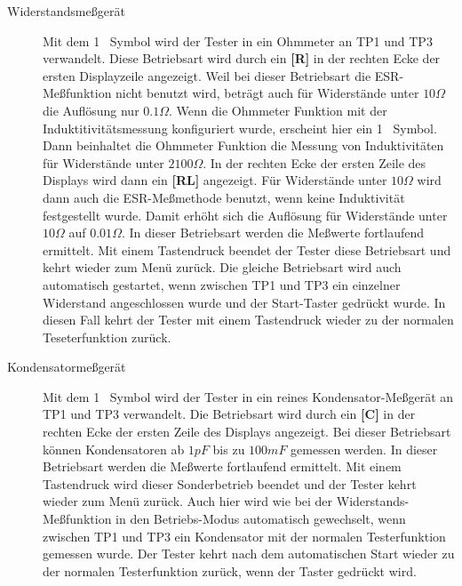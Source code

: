 \begin{description}
 \item[Widerstandsmeßgerät]
Mit dem \mbox{1 } Symbol wird der Tester in ein Ohmmeter an TP1 und TP3 verwandelt. Diese Betriebsart wird durch
ein {\bf[R]} in der rechten Ecke der ersten Displayzeile angezeigt. Weil bei dieser Betriebsart die
ESR-Meßfunktion nicht benutzt wird, beträgt auch für Widerstände unter \(10\Omega\) die Auflösung
nur \(0.1\Omega\). Wenn die Ohmmeter Funktion mit der Induktitivitätsmessung konfiguriert wurde,
erscheint hier ein \mbox{1 \electricR {}} Symbol.
Dann beinhaltet die Ohmmeter Funktion die Messung von Induktivitäten für Widerstände unter \(2100\Omega\). 
In der rechten Ecke der ersten Zeile des Displays wird dann ein {\bf[RL]} angezeigt.
Für Widerstände unter \(10\Omega\) wird dann auch die ESR-Meßmethode benutzt,
wenn keine Induktivität festgestellt wurde. Damit erhöht sich die Auflösung für Widerstände
unter \(10\Omega\) auf \(0.01\Omega\).
In dieser Betriebsart werden die Meßwerte fortlaufend ermittelt.
Mit einem Tastendruck beendet der Tester diese Betriebsart und kehrt wieder zum Menü zurück.
Die gleiche Betriebsart wird auch automatisch gestartet, wenn zwischen TP1 und TP3 ein einzelner Widerstand
angeschlossen wurde und der Start-Taster gedrückt wurde. In diesen Fall kehrt der Tester mit einem Tastendruck 
wieder zu der normalen Teseterfunktion zurück.

 \item[Kondensatormeßgerät]
Mit dem \mbox{1 } Symbol wird der Tester
in ein reines Kondensator-Meßgerät an TP1 und TP3 verwandelt.
Die Betriebsart wird durch ein {\bf[C]} in der rechten Ecke der ersten Zeile des Displays angezeigt.
Bei dieser Betriebsart können Kondensatoren ab \(1pF\) bis zu \(100mF\) gemessen werden.
In dieser Betriebsart werden die Meßwerte fortlaufend ermittelt.
Mit einem Tastendruck wird dieser Sonderbetrieb beendet und der Tester kehrt wieder zum Menü zurück.
Auch hier wird wie bei der Widerstands-Meßfunktion in den  Betriebs-Modus automatisch gewechselt,
 wenn zwischen TP1 und TP3 ein Kondensator mit der normalen Testerfunktion gemessen wurde.
Der Tester kehrt nach dem automatischen Start wieder zu der normalen Testerfunktion zurück, wenn der Taster gedrückt wird.


\end{description}
